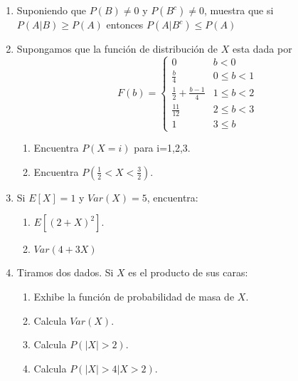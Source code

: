\documentclass[12pt]{report}
\begin{document}
\begin{enumerate}
    \item Suponiendo que $P(B)\neq 0$ y $P(B^c)\neq 0$, muestra que si $P(A\vert B) \geq P(A)$ entonces $P(A\vert B^c) \leq P(A)$
    \item Supongamos que la función de distribución de $X$ esta dada por
          \begin{equation*}
              F(b)=
              \begin{cases}
                  0                         & b < 0      \\
                  \frac{b}{4}               & 0\leq b <1 \\
                  \frac{1}{2}+\frac{b-1}{4} & 1\leq b <2 \\
                  \frac{11}{12}             & 2\leq b <3 \\
                  1                         & 3\leq b
              \end{cases}
          \end{equation*}
          \begin{enumerate}
              \item Encuentra $P\left(X=i\right)$ para i=1,2,3.
              \item Encuentra $P\left(\frac{1}{2}<X<\frac{3}{2}\right)$.
          \end{enumerate}
    \item Si $E\left[X\right]=1$ y $Var\left(X\right)=5$, encuentra:
          \begin{enumerate}
              \item $E\left[(2+X)^2\right]$.
              \item $Var\left(4+3X\right)$
          \end{enumerate}
    \item Tiramos dos dados. Si $X$ es el producto de sus caras:
          \begin{enumerate}
              \item Exhibe la función de probabilidad de masa de $X$.
              \item Calcula $Var\left(X\right)$.
              \item Calcula $P(\vert X\vert > 2)$.
              \item Calcula $P(\vert X\vert > 4\vert X>2)$.

          \end{enumerate}
\end{enumerate}
\end{document}
